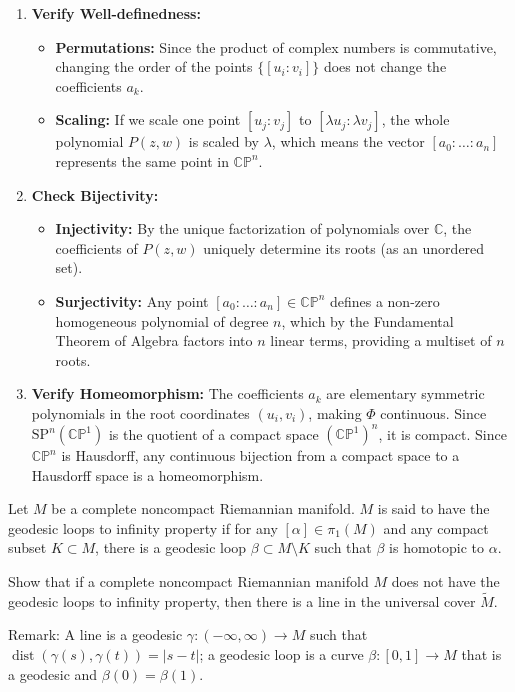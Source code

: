 \begin{solution}
\begin{enumerate}
    \item \textbf{Verify Well-definedness:}
    \begin{itemize}
        \item \textbf{Permutations:} Since the product of complex numbers is commutative, changing the order of the points $\{[u_i : v_i]\}$ does not change the coefficients $a_k$.
        \item \textbf{Scaling:} If we scale one point $[u_j : v_j]$ to $[\lambda u_j : \lambda v_j]$, the whole polynomial $P(z, w)$ is scaled by $\lambda$, which means the vector $[a_0 : \dots : a_n]$ represents the same point in $\mathbb{CP}^n$.
    \end{itemize}
    
    \item \textbf{Check Bijectivity:}
    \begin{itemize}
        \item \textbf{Injectivity:} By the unique factorization of polynomials over $\mathbb{C}$, the coefficients of $P(z, w)$ uniquely determine its roots (as an unordered set).
        \item \textbf{Surjectivity:} Any point $[a_0 : \dots : a_n] \in \mathbb{CP}^n$ defines a non-zero homogeneous polynomial of degree $n$, which by the Fundamental Theorem of Algebra factors into $n$ linear terms, providing a multiset of $n$ roots.
    \end{itemize}
    
    \item \textbf{Verify Homeomorphism:}
    The coefficients $a_k$ are elementary symmetric polynomials in the root coordinates $(u_i, v_i)$, making $\Phi$ continuous.
    Since $\mathrm{SP}^n(\mathbb{CP}^1)$ is the quotient of a compact space $(\mathbb{CP}^1)^n$, it is compact. Since $\mathbb{CP}^n$ is Hausdorff, any continuous bijection from a compact space to a Hausdorff space is a homeomorphism.
\end{enumerate}
\end{solution}

\begin{exercise}
\label{geometry:2022:4}
Let $M$ be a complete noncompact Riemannian manifold. $M$ is said to have the geodesic loops to infinity property if for any $[\alpha] \in \pi_1(M)$ and any compact subset $K \subset M$, there is a geodesic loop $\beta \subset M \setminus K$ such that $\beta$ is homotopic to $\alpha$.

Show that if a complete noncompact Riemannian manifold $M$ does not have the geodesic loops to infinity property, then there is a line in the universal cover $\widetilde{M}$.

Remark: A line is a geodesic $\gamma : (-\infty, \infty) \to M$ such that $\operatorname{dist}(\gamma(s), \gamma(t)) = |s - t|$; a geodesic loop is a curve $\beta : [0, 1] \to M$ that is a geodesic and $\beta(0) = \beta(1)$.
\end{exercise}

